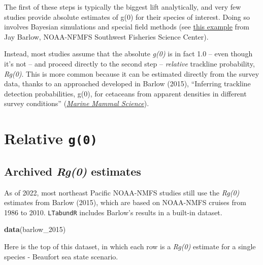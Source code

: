 \documentclass[
]{book}
\newenvironment{Shaded}{\begin{snugshade}}{\end{snugshade}}
\newcommand{\DecValTok}[1]{\textcolor[rgb]{0.00,0.00,0.81}{#1}}
\newcommand{\KeywordTok}[1]{\textcolor[rgb]{0.13,0.29,0.53}{\textbf{#1}}}
\newcommand{\NormalTok}[1]{#1}
\begin{document}
The first of these steps is typically the biggest lift analytically, and very few studies provide absolute estimates of g(0) for their species of interest. Doing so involves Bayesian simulations and special field methods (see \href{https://www.taylorfrancis.com/chapters/edit/10.1201/9781003211167-19/trackline-detection-probability-long-diving-whales-jay-barlow}{this example} from Jay Barlow, NOAA-NFMFS Southwest Fisheries Science Center).

Instead, most studies assume that the absolute \emph{g(0)} is in fact 1.0 -- even though it's not -- and proceed directly to the second step -- \emph{relative} trackline probability, \emph{Rg(0)}. This is more common because it can be estimated directly from the survey data, thanks to an approached developed in Barlow (2015), ``Inferring trackline detection probabilities, g(0), for cetaceans from apparent densities in different survey conditions'' (\href{https://onlinelibrary.wiley.com/doi/abs/10.1111/mms.12205?casa_token=BuVMa8KCgQUAAAAA:iXIQxWBCnMaWWNlNTSQ5EC2LYmodDYGHs0r-pgIPNxOCLRZzf8xXZ3vDUOlUCZRptmDsztr0Hh4}{\emph{Marine Mammal Science}}).

\hypertarget{relative-g0}{%
\section*{\texorpdfstring{Relative \texttt{g(0)}}{Relative g(0)}}\label{relative-g0}}

\hypertarget{archived-rg0-estimates}{%
\subsection*{\texorpdfstring{Archived \emph{Rg(0)} estimates}{Archived Rg(0) estimates}}\label{archived-rg0-estimates}}

As of 2022, most northeast Pacific NOAA-NMFS studies still use the \emph{Rg(0)} estimates from Barlow (2015), which are based on NOAA-NMFS cruises from 1986 to 2010. \texttt{LTabundR} includes Barlow's results in a built-in dataset.

\begin{Shaded}
\begin{Highlighting}[]
\KeywordTok{data}\NormalTok{(barlow_}\DecValTok{2015}\NormalTok{)}
\end{Highlighting}
\end{Shaded}

Here is the top of this dataset, in which each row is a \emph{Rg(0)} estimate for a single species - Beaufort sea state scenario.
\end{document}
